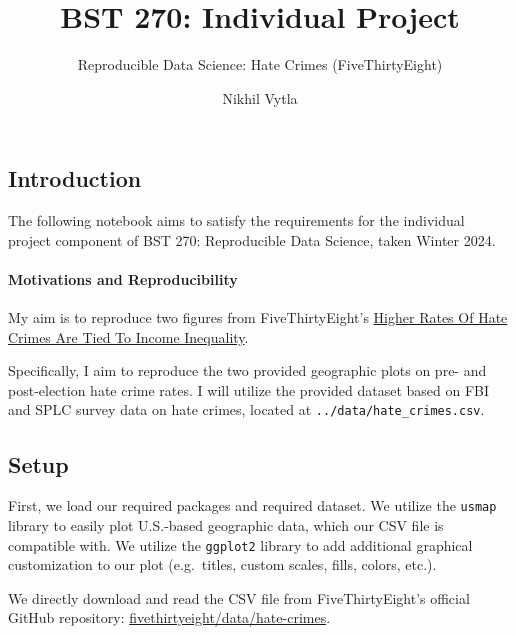 \documentclass[
  letterpaper,
  DIV=11,
  numbers=noendperiod]{scrartcl}
\title{BST 270: Individual Project}
\subtitle{Reproducible Data Science: Hate Crimes (FiveThirtyEight)}
\author{Nikhil Vytla}
\date{}
\let\oldparagraph\paragraph
\renewcommand{\paragraph}[1]{\oldparagraph{#1}\mbox{}}
\begin{document}
\maketitle
\ifdefined\Shaded\renewenvironment{Shaded}{\begin{tcolorbox}[interior hidden, breakable, boxrule=0pt, frame hidden, sharp corners, enhanced, borderline west={3pt}{0pt}{shadecolor}]}{\end{tcolorbox}}\fi

\hypertarget{introduction}{%
\subsection{Introduction}\label{introduction}}

The following notebook aims to satisfy the requirements for the
individual project component of BST 270: Reproducible Data Science,
taken Winter 2024.

\hypertarget{motivations-and-reproducibility}{%
\paragraph{Motivations and
Reproducibility}\label{motivations-and-reproducibility}}

My aim is to reproduce two figures from FiveThirtyEight's
\href{https://fivethirtyeight.com/features/higher-rates-of-hate-crimes-are-tied-to-income-inequality/}{Higher
Rates Of Hate Crimes Are Tied To Income Inequality}.

Specifically, I aim to reproduce the two provided geographic plots on
pre- and post-election hate crime rates. I will utilize the provided
dataset based on FBI and SPLC survey data on hate crimes, located at
\texttt{../data/hate\_crimes.csv}.

\hypertarget{setup}{%
\subsection{Setup}\label{setup}}

First, we load our required packages and required dataset. We utilize
the \texttt{usmap} library to easily plot U.S.-based geographic data,
which our CSV file is compatible with. We utilize the \texttt{ggplot2}
library to add additional graphical customization to our plot
(e.g.~titles, custom scales, fills, colors, etc.).

We directly download and read the CSV file from FiveThirtyEight's
official GitHub repository:
\href{https://github.com/fivethirtyeight/data/tree/master/hate-crimes}{fivethirtyeight/data/hate-crimes}.
\end{document}
